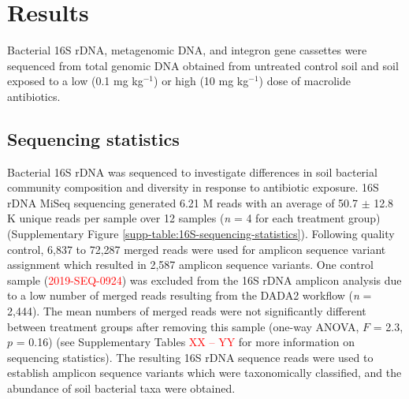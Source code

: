 \chapter{Results}

Bacterial 16S rDNA, metagenomic DNA, and integron gene cassettes were sequenced from total genomic DNA obtained from untreated control soil and soil exposed to a low (0.1 mg kg$^{-1}$) or high (10 mg kg$^{-1}$) dose of macrolide antibiotics.


\section{Sequencing statistics} \label{section:sequencing-statistics}

Bacterial 16S rDNA was sequenced to investigate differences in soil bacterial community composition and diversity in response to antibiotic exposure.
16S rDNA MiSeq sequencing generated 6.21 M reads with an average of 50.7 $\pm$ 12.8 K unique reads per sample over 12 samples  (\textit{n} = 4 for each treatment group) (Supplementary Figure \ref{supp-table:16S-sequencing-statistics}).
Following quality control, 6,837 to 72,287 merged reads were used for amplicon sequence variant assignment which resulted in 2,587 amplicon sequence variants.
One control sample (\textcolor{red}{2019-SEQ-0924}) was excluded from the 16S rDNA amplicon analysis due to a low number of merged reads resulting from the DADA2 workflow  (\textit{n} = 2,444).
The mean numbers of merged reads were not significantly different between treatment groups after removing this sample (one-way ANOVA, $F$ = 2.3, $p$ = 0.16) (see Supplementary Tables \textcolor{red}{XX -- YY} for more information on sequencing statistics).
The resulting 16S rDNA sequence reads were used to establish amplicon sequence variants which were taxonomically classified, and the abundance of soil bacterial taxa were obtained.

